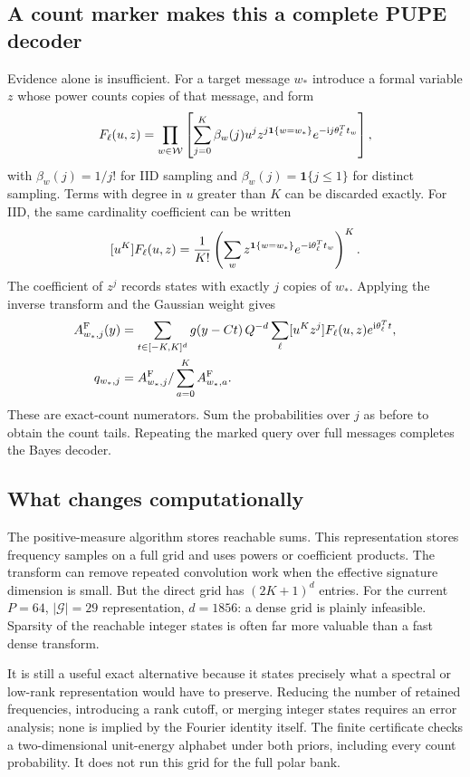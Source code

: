 \documentclass[10pt,a4paper]{article}
\newcommand{\calW}{\mathcal W}
\newcommand{\ind}{\mathbf 1}
\begin{document}
\subsection{A count marker makes this a complete PUPE decoder}
Evidence alone is insufficient. For a target message $w_*$ introduce a formal variable $z$ whose power counts
copies of that message, and form
\begin{equation}
 F_\ell(u,z)=\prod_{w\in\calW}
 \left[\sum_{j=0}^K\beta_w(j)u^j
 z^{j\ind\{w=w_*\}}e^{-{\rm i}j\theta_\ell^Tt_w}\right],
 \label{eq:fourier-marker}
\end{equation}
with $\beta_w(j)=1/j!$ for IID sampling and $\beta_w(j)=\ind\{j\leq1\}$ for distinct sampling.
Terms with degree in $u$ greater than $K$ can be discarded exactly.
For IID, the same cardinality coefficient can be written
\[
 [u^K]F_\ell(u,z)=
 \frac1{K!}\left(\sum_w z^{\ind\{w=w_*\}}
                      e^{-{\rm i}\theta_\ell^Tt_w}\right)^K.
\]
The coefficient of $z^j$ records states with exactly $j$ copies of $w_*$. Applying the inverse transform and
the Gaussian weight gives
\begin{align}
 A^{\rm F}_{w_*,j}(y)&=
 \sum_{t\in[-K,K]^d}g(y-Ct)\,
 Q^{-d}\sum_\ell [u^Kz^j]F_\ell(u,z)e^{{\rm i}\theta_\ell^Tt},\\
 q_{w_*,j}&=A^{\rm F}_{w_*,j}/\sum_{a=0}^K A^{\rm F}_{w_*,a}.
 \label{eq:fourier-query}
\end{align}
These are exact-count numerators. Sum the probabilities over $j$ as before to obtain the count tails. Repeating the marked query over full messages completes the Bayes decoder.

\subsection{What changes computationally}
The positive-measure algorithm stores reachable sums. This representation stores frequency samples on a full
grid and uses powers or coefficient products. The transform can remove repeated convolution work when the
effective signature dimension is small. But the direct grid has $(2K+1)^d$ entries.
For the current $P=64$, $|\mathcal G|=29$ representation, $d=1856$: a dense grid is plainly infeasible.
Sparsity of the reachable integer states is often far more valuable than a fast dense transform.

It is still a useful exact alternative because it states precisely what a spectral or low-rank representation
would have to preserve. Reducing the number of retained frequencies, introducing a rank cutoff, or merging
integer states requires an error analysis; none is implied by the Fourier identity itself.
The finite certificate checks a two-dimensional unit-energy alphabet under both priors, including every count
probability. It does not run this grid for the full polar bank.
\end{document}
